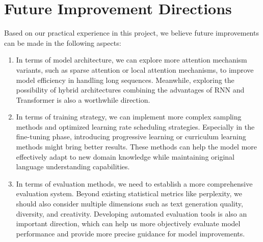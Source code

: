 \documentclass[12pt,oneside]{article}
\begin{document}
\section{Future Improvement Directions}

Based on our practical experience in this project, we believe future improvements can be made in the following aspects:

\begin{enumerate}
\item In terms of model architecture, we can explore more attention mechanism variants, such as sparse attention or local attention mechanisms, to improve model efficiency in handling long sequences. Meanwhile, exploring the possibility of hybrid architectures combining the advantages of RNN and Transformer is also a worthwhile direction.

\item In terms of training strategy, we can implement more complex sampling methods and optimized learning rate scheduling strategies. Especially in the fine-tuning phase, introducing progressive learning or curriculum learning methods might bring better results. These methods can help the model more effectively adapt to new domain knowledge while maintaining original language understanding capabilities.

\item In terms of evaluation methods, we need to establish a more comprehensive evaluation system. Beyond existing statistical metrics like perplexity, we should also consider multiple dimensions such as text generation quality, diversity, and creativity. Developing automated evaluation tools is also an important direction, which can help us more objectively evaluate model performance and provide more precise guidance for model improvements.
\end{enumerate}
\end{document}
